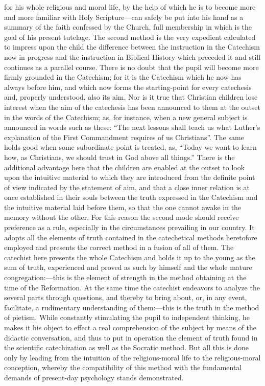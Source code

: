 for his whole religious and moral life, by the help of which he is to become more and more familiar with Holy Scripture—can safely be put into his hand as a summary of the faith confessed by the Church, full membership in which is the goal of his present tutelage. The second method is the very expedient calculated to impress upon the child the difference between the instruction in the Catechism now in progress and the instruction in Biblical History which preceded it and still continues as a parallel course. There is no doubt that the pupil will become more firmly grounded in the Catechism; for it is the Catechism which he now has always before him, and which now forms the starting-point for every catechesis and, properly understood, also its aim. Nor is it true that Christian children lose interest when the aim of the catechesis has been announced to them at the outset in the words of the Catechism; as, for instance, when a new general subject is announced in words such as these: “The next lessons shall teach us what Luther’s explanation of the First Commandment requires of us Christians”. The same holds good when some subordinate point is treated, as, “Today we want to learn how, as Christians, we should trust in God above all things.” There is the additional advantage here that the children are enabled at the outset to look upon the intuitive material to which they are introduced from the definite point of view indicated by the statement of aim, and that a close inner relation is at once established in their souls between the truth expressed in the Catechism and the intuitive material laid before them, so that the one cannot awake in the memory without the other. For this reason the second mode should receive preference as a rule, especially in the circumstances prevailing in our country. It adopts all the elements of truth contained in the catechetical methods heretofore employed and presents the correct method in a fusion of all of them. The
catechist here presents the whole Catechism and holds it up to the young as the sum of truth, experienced and proved as such by himself and the whole mature congregation:—this is the element of strength in the method obtaining at the time of the Reformation. At the same time the catechist endeavors to analyze the several parts through questions, and thereby to bring about, or, in any event, facilitate, a rudimentary understanding of them:—this is the truth in the method of pietism. While constantly stimulating the pupil to independent thinking, he makes it his object to effect a real comprehension of the subject by means of the didactic conversation, and thus to put in operation the element of truth found in the scientific catechization as well as the Socratic method. But all this is done only by leading from the intuition of the religious-moral life to the religious-moral conception, whereby the compatibility of this method with the fundamental demands of present-day psychology stands demonstrated.

